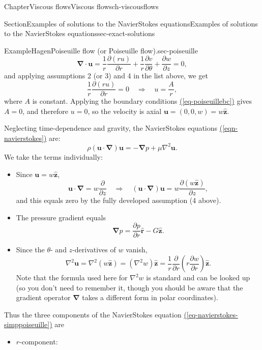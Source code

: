 \documentclass[oneside,10pt,]{book}
\newcommand{\xreffont}{\relax}
\newcommand{\ptxlistdisc}{\raisebox{0.3ex}{\textbullet}}
\numberwithin{equation}{section}
\newcommand{\pd}[2]{\frac{\partial#1}{\partial#2}}
\newcommand{\bu}{\boldsymbol{u}}
\newcommand{\br}{\boldsymbol{r}}
\newcommand{\bz}{\boldsymbol{z}}
\newcommand{\bnabla}{\boldsymbol{\nabla}}
\begin{document}
\begin{chapterptx}{Chapter}{Viscous flows}{}{Viscous flows}{}{}{ch-viscousflows}
\begin{sectionptx}{Section}{Examples of solutions to the Navier\textendash{}Stokes equations}{}{Examples of solutions to the Navier\textendash{}Stokes equations}{}{}{sec-exact-solutions}
\begin{example}{Example}{Hagen\textendash{}Poiseuille flow (or Poiseuille flow).}{sec-poiseuille}
\begin{equation*}
\bnabla\cdot\bu=\frac1r\pd{(ru)}{r}+\frac1r\pd{v}{\theta}+\pd{w}{z}=0,
\end{equation*}
and applying assumptions 2 (or 3) and 4 in the list above, we get%
\begin{equation*}
\frac1r\pd{(ru)}{r}=0
\quad\Rightarrow\quad
u=\frac Ar,
\end{equation*}
where \(A\) is constant. Applying the boundary conditions \hyperref[eq-poiseuillebc]{({\xreffont\ref{eq-poiseuillebc}})} gives \(A=0\), and therefore \(u=0\), so the velocity is axial \(\bu=(0,0,w)=w\hat{\bz}\).%
\par
Neglecting time-dependence and gravity, the Navier\textendash{}Stokes equations \hyperref[eqn-navierstokes]{({\xreffont\ref{eqn-navierstokes}})} are:%
\begin{equation}
\rho\left(\bu\cdot\bnabla\right)\bu=-\bnabla p+\mu\nabla^2\bu.\label{eq-navierstokes-simppoiseuille}
\end{equation}
We take the terms individually:%
\begin{itemize}[label=\ptxlistdisc]
\item{}Since \(\bu=w\hat{\bz}\),%
\begin{equation*}
\bu\cdot\bnabla=w\pd{}{z}
\quad\Rightarrow\quad
\left(\bu\cdot\bnabla\right)\bu
=w\pd{(w\hat{\bz})}{z},
\end{equation*}
and this equals zero by the fully developed assumption (4 above).%
\item{}The pressure gradient equals%
\begin{equation*}
\bnabla p=\pd{p}{r}\hat{\br}-G\hat{\bz}.
\end{equation*}
%
\item{}Since the \(\theta\)- and \(z\)-derivatives of \(w\) vanish,%
\begin{equation*}
\nabla^2\bu
=\nabla^2\left(w\hat{\bz}\right)
=\left(\nabla^2w\right)\hat{\bz}
=\frac1r\pd{}{r}\left(r\pd{w}{r}\right)\hat{\bz}.
\end{equation*}
Note that the formula used here for \(\nabla^2w\) is standard and can be looked up (so you don't need to remember it, though you should be aware that the gradient operator \(\bnabla\) takes a different form in polar coordinates).%
\end{itemize}
Thus the three components of the Navier\textendash{}Stokes equation \hyperref[eq-navierstokes-simppoiseuille]{({\xreffont\ref{eq-navierstokes-simppoiseuille}})} are%
\begin{itemize}[label=\ptxlistdisc]
\item{}\(r\)-component:%

\end{itemize}
\end{example}
\end{sectionptx}
\end{chapterptx}
\end{document}
